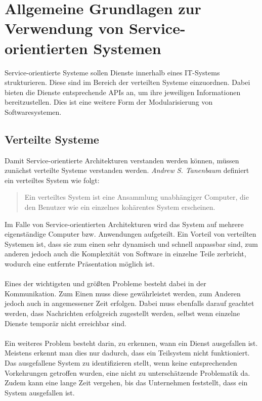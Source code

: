 \chapter[Grundlagen von Service-orientierten Systemen]{Allgemeine Grundlagen zur Verwendung von Service-orientierten Systemen}
\label{chap:Grundlagen}
Service-orientierte Systeme sollen Dienste innerhalb eines IT-Systems strukturieren. Diese sind  im Bereich der verteilten Systeme einzuordnen. Dabei bieten die Dienste entsprechende APIs an, um ihre jeweiligen Informationen bereitzustellen. Dies ist eine weitere Form der Modularisierung von Softwaresystemen.

\section{Verteilte Systeme}
\label{sec:VerteilteAnwendungen}
Damit Service-orientierte Architekturen verstanden werden können, müssen zunächst verteilte Systeme verstanden werden. \textit{Andrew S. Tanenbaum} definiert ein verteiltes System wie folgt:
\begin{quotation}
    \frqq Ein verteiltes System ist eine Ansammlung unabhängiger Computer, die den Benutzer wie ein einzelnes kohärentes System erscheinen.\flqq\cite[S. 19]{tanenbaum:VerteilteSysteme}
\end{quotation}

Im Falle von Service-orientierten Architekturen wird das System auf mehrere eigenständige Computer bzw. Anwendungen aufgeteilt. Ein Vorteil von verteilten Systemen ist, dass sie zum einen sehr dynamisch und schnell anpassbar sind, zum anderen jedoch auch die Komplexität von Software in einzelne Teile zerbricht, wodurch eine entfernte Präsentation möglich ist.
\\\\
Eines der wichtigsten und größten Probleme besteht dabei in der Kommunikation. Zum Einen muss diese gewährleistet werden, zum Anderen jedoch auch in angemessener Zeit erfolgen. Dabei muss ebenfalls darauf geachtet werden, dass Nachrichten erfolgreich zugestellt werden, selbst wenn einzelne Dienste temporär nicht erreichbar sind.
\\\\
Ein weiteres Problem besteht darin, zu erkennen, wann ein Dienst ausgefallen ist. Meistens erkennt man dies nur dadurch, dass ein Teilsystem nicht funktioniert. Das ausgefallene System zu identifizieren stellt, wenn keine entsprechenden Vorkehrungen getroffen wurden, eine nicht zu unterschätzende Problematik da. Zudem kann eine lange Zeit vergehen, bis das Unternehmen feststellt, dass ein System ausgefallen ist. 

